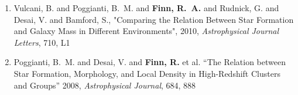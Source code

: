 \documentclass[11pt]{article}
\begin{document}
\begin{flushleft}
\begin{enumerate}{\setlength{\leftmargin}{0in}}
\item {Vulcani}, B. and {Poggianti}, B.~M. and {\bf Finn, R.~A.} and {Rudnick}, G. and 
	{Desai}, V. and {Bamford}, S.,
"{Comparing the Relation Between Star Formation and Galaxy Mass in Different Environments}",
2010, {\it Astrophysical Journal Letters}, 710, {L1}
\vspace{-.2cm}
\item {Poggianti}, B.~M. and {Desai}, V. and {\bf {Finn}, R.} et al. 
``The Relation between Star Formation, Morphology, and Local Density in High-Redshift 
Clusters and Groups''
2008, {\it Astrophysical Journal}, 684, 888
\vspace{-.2cm}

\end{enumerate}
\end{flushleft}
\end{document}
